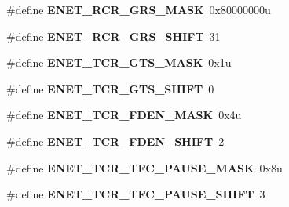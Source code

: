 \begin{DoxyCompactItemize}
\item 
\hypertarget{group___e_n_e_t___register___masks_ga01f144e600f9007df4d9cdc9d7f3879a}{}\#define {\bfseries E\+N\+E\+T\+\_\+\+R\+C\+R\+\_\+\+G\+R\+S\+\_\+\+M\+A\+S\+K}~0x80000000u\label{group___e_n_e_t___register___masks_ga01f144e600f9007df4d9cdc9d7f3879a}

\item 
\hypertarget{group___e_n_e_t___register___masks_ga6e192fa69584cca04e717c077d1bf702}{}\#define {\bfseries E\+N\+E\+T\+\_\+\+R\+C\+R\+\_\+\+G\+R\+S\+\_\+\+S\+H\+I\+F\+T}~31\label{group___e_n_e_t___register___masks_ga6e192fa69584cca04e717c077d1bf702}

\item 
\hypertarget{group___e_n_e_t___register___masks_ga99d109b14e8bda3be968900968045b8d}{}\#define {\bfseries E\+N\+E\+T\+\_\+\+T\+C\+R\+\_\+\+G\+T\+S\+\_\+\+M\+A\+S\+K}~0x1u\label{group___e_n_e_t___register___masks_ga99d109b14e8bda3be968900968045b8d}

\item 
\hypertarget{group___e_n_e_t___register___masks_ga6f1db14f8c66c67580cb518d13f99cc5}{}\#define {\bfseries E\+N\+E\+T\+\_\+\+T\+C\+R\+\_\+\+G\+T\+S\+\_\+\+S\+H\+I\+F\+T}~0\label{group___e_n_e_t___register___masks_ga6f1db14f8c66c67580cb518d13f99cc5}

\item 
\hypertarget{group___e_n_e_t___register___masks_gadf5843a438d25920ade38488aa66a81c}{}\#define {\bfseries E\+N\+E\+T\+\_\+\+T\+C\+R\+\_\+\+F\+D\+E\+N\+\_\+\+M\+A\+S\+K}~0x4u\label{group___e_n_e_t___register___masks_gadf5843a438d25920ade38488aa66a81c}

\item 
\hypertarget{group___e_n_e_t___register___masks_ga65366ef60776e87cc2a287656568fb8e}{}\#define {\bfseries E\+N\+E\+T\+\_\+\+T\+C\+R\+\_\+\+F\+D\+E\+N\+\_\+\+S\+H\+I\+F\+T}~2\label{group___e_n_e_t___register___masks_ga65366ef60776e87cc2a287656568fb8e}

\item 
\hypertarget{group___e_n_e_t___register___masks_ga71a1167639f6bec0334adb16cdc8e049}{}\#define {\bfseries E\+N\+E\+T\+\_\+\+T\+C\+R\+\_\+\+T\+F\+C\+\_\+\+P\+A\+U\+S\+E\+\_\+\+M\+A\+S\+K}~0x8u\label{group___e_n_e_t___register___masks_ga71a1167639f6bec0334adb16cdc8e049}

\item 
\hypertarget{group___e_n_e_t___register___masks_ga100df2882bc10658b602c3b2f90c0ed3}{}\#define {\bfseries E\+N\+E\+T\+\_\+\+T\+C\+R\+\_\+\+T\+F\+C\+\_\+\+P\+A\+U\+S\+E\+\_\+\+S\+H\+I\+F\+T}~3\label{group___e_n_e_t___register___masks_ga100df2882bc10658b602c3b2f90c0ed3}


\end{DoxyCompactItemize}
